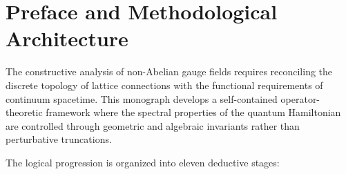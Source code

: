\documentclass[11pt,reqno]{article}
\begin{document}
\tableofcontents
\newpage

\section*{Preface and Methodological Architecture}

The constructive analysis of non-Abelian gauge fields requires reconciling the discrete topology of lattice connections with the functional requirements of continuum spacetime. This monograph develops a self-contained operator-theoretic framework where the spectral properties of the quantum Hamiltonian are controlled through geometric and algebraic invariants rather than perturbative truncations.

The logical progression is organized into eleven deductive stages:
\end{document}
